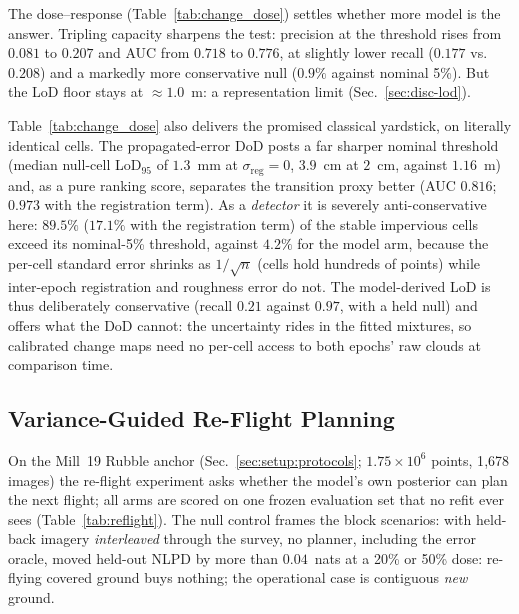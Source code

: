  The dose--response (Table~\ref{tab:change_dose}) settles whether more
model is the answer. Tripling capacity sharpens the test: precision
at the threshold rises from $0.081$ to $0.207$ and AUC from $0.718$
to $0.776$, at slightly lower recall ($0.177$ vs.\ $0.208$) and a
markedly more conservative null ($0.9\%$ against nominal
5\%). But the LoD floor stays at ${\approx}1.0$~m: a representation
limit (Sec.~\ref{sec:disc-lod}).

 Table~\ref{tab:change_dose} also delivers the promised classical
yardstick, on literally identical cells. The propagated-error DoD
posts a far sharper nominal threshold (median null-cell LoD$_{95}$
of $1.3$~mm at $\sigma_{\mathrm{reg}}=0$, $3.9$~cm at $2$~cm, against
$1.16$~m) and, as a pure ranking score, separates the transition
proxy better (AUC $0.816$; $0.973$ with the registration term). As a
\emph{detector} it is severely anti-conservative here: $89.5\%$
($17.1\%$ with the registration term) of the stable impervious cells
exceed its nominal-5\% threshold, against $4.2\%$ for the model arm,
because the per-cell standard error shrinks as $1/\sqrt{n}$ (cells
hold hundreds of points) while inter-epoch registration and roughness
error do not. The model-derived LoD is thus deliberately
conservative (recall $0.21$ against $0.97$, with a held null) and
offers what the DoD cannot: the uncertainty rides in the fitted
mixtures, so calibrated change maps need no per-cell access to both
epochs' raw clouds at comparison time.

\subsection{Variance-Guided Re-Flight Planning}
\label{sec:results:reflight}

On the Mill~19 Rubble anchor (Sec.~\ref{sec:setup:protocols};
$1.75\times10^{6}$ points, 1{,}678 images) the re-flight experiment
asks whether the model's own posterior can plan the next flight; all
arms are scored on one frozen evaluation set that no refit ever sees
(Table~\ref{tab:reflight}). The null control frames the block
scenarios: with held-back imagery \emph{interleaved} through the
survey, no planner, including the error oracle, moved held-out NLPD
by more than $0.04$~nats at a 20\% or 50\% dose: re-flying covered
ground buys nothing; the operational case is contiguous \emph{new}
ground.

